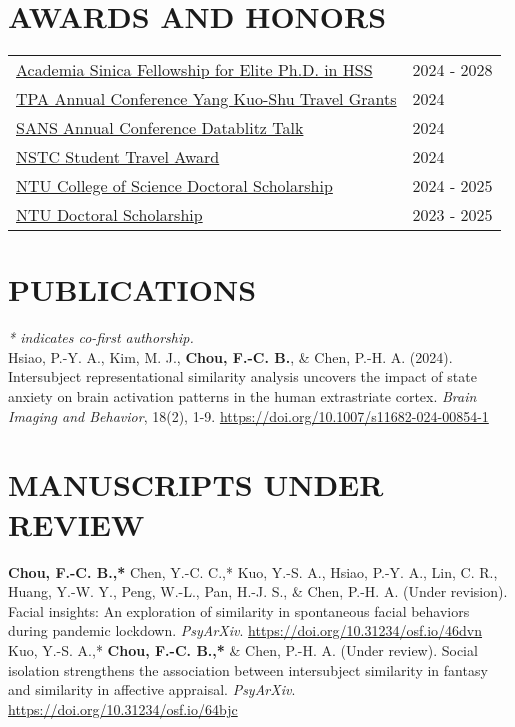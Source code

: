 \documentclass[a4paper,12pt]{article}
\newcommand{\itemspace}{7pt} %
\begin{document}
\section*{AWARDS AND HONORS}
\begin{flushright}
\begin{tabular}{@{}p{}@{}p{}@{}}
\href{https://www.sinica.edu.tw/en/News_Content/56/2728}{Academia Sinica Fellowship for Elite Ph.D. in HSS} & \hfill 2024 - 2028 \\[2pt]
\href{https://www.tpa-tw.org/yang-kuoshu-travel-grant?lang=en}{TPA Annual Conference Yang Kuo-Shu Travel Grants} & \hfill 2024\\[2pt]
\href{https://socialaffectiveneuro.org/wp-content/uploads/2024/05/SANS-Conference-2024_Program_Final.pdf}{SANS Annual Conference Datablitz Talk} & \hfill 2024\\[2pt]
\href{https://www.nstc.gov.tw/sci/ch/detail/259f99f5-51ce-4582-8546-9d7caee96871}{NSTC Student Travel Award}  & \hfill 2024\\[2pt]
\href{https://www.science.ntu.edu.tw/file/rule50.pdf}{NTU College of Science Doctoral Scholarship}  & \hfill 2024 - 2025\\[2pt]
\href{https://ord.ntu.edu.tw/w/ordntu/GW_20072012180521920/}{NTU Doctoral Scholarship}  & \hfill 2023 - 2025\\[2pt]
\end{tabular}
\end{flushright}

\section*{PUBLICATIONS}
\textit{* indicates co-first authorship.} \\[10pt]
\noindent
Hsiao, P.-Y. A., Kim, M. J., \textbf{Chou, F.-C. B.}, \& Chen, P.-H. A. (2024). Intersubject representational similarity analysis uncovers the impact of state anxiety on brain activation patterns in the human extrastriate cortex. \textit{Brain Imaging and Behavior}, 18(2), 1-9. \href{https://doi.org/10.1007/s11682-024-00854-1}{https://doi.org/10.1007/s11682-024-00854-1}
\\[\itemspace]

\section*{MANUSCRIPTS UNDER REVIEW}
\noindent\textbf{Chou, F.-C. B.,*} Chen, Y.-C. C.,* Kuo, Y.-S. A., Hsiao, P.-Y. A., Lin, C. R., Huang, Y.-W. Y., Peng, W.-L., Pan, H.-J. S., \& Chen, P.-H. A. (Under revision). Facial insights: An exploration of similarity in spontaneous facial behaviors during pandemic lockdown. \textit{PsyArXiv}. \href{https://doi.org/10.31234/osf.io/46dvn} {https://doi.org/10.31234/osf.io/46dvn}\\[\itemspace]
\noindent Kuo, Y.-S. A.,* \textbf{Chou, F.-C. B.,*} \& Chen, P.-H. A. (Under review). Social isolation strengthens the association between intersubject similarity in fantasy and similarity in affective appraisal. \textit{PsyArXiv}. \href{https://doi.org/10.31234/osf.io/64bjc} {https://doi.org/10.31234/osf.io/64bjc}
\end{document}
